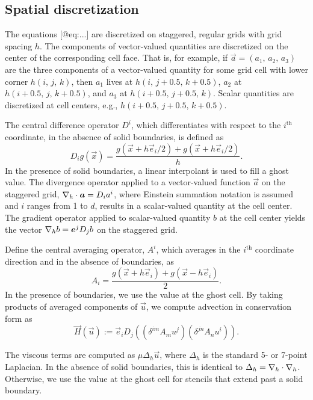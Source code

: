 \subsection{Spatial discretization}

The equations [@eq:...] are discretized on staggered, regular grids with grid
spacing $h$. The components of vector-valued quantities are discretized on the
center of the corresponding cell face. That is, for example, if
$\vec{a} = (a_1,\,a_2,\,a_3)$ are the three components of a vector-valued
quantity for some grid cell with lower corner $h(i,\,j,\,k)$, then $a_1$
lives at $h(i,\,j+0.5,\,k+0.5)$, $a_2$ at $h(i+0.5,\,j,\,k+0.5)$, and $a_3$ at
$h(i+0.5,\,j+0.5,\,k)$. Scalar quantities are discretized at cell centers,
e.g., $h(i+0.5,\,j+0.5,\,k+0.5)$.

The central difference operator $D^i$, which differentiates with respect to
the $i^\text{th}$ coordinate, in the absence of solid boundaries, is defined as
\begin{equation}
    D_ig(\vec{x}) = \frac{g(\vec{x}+h\vec{e}_i/2) + g(\vec{x}+h\vec{e}_i/2)}{h}.
\end{equation}
In the presence of solid boundaries, a linear interpolant is used to fill a
ghost value. The divergence operator applied to a vector-valued function
$\vec{a}$ on the staggered grid, $\nabla_h\cdot\boldsymbol{a} = D_ia^i$, where Einstein
summation notation is assumed and $i$ ranges from 1 to $d$, results in
a scalar-valued quantity at the cell center. The gradient operator applied to
scalar-valued quantity $b$ at the cell center yields the vector
$\nabla_hb = \boldsymbol{e}^jD_jb$ on the staggered grid.

Define the central averaging operator, $A^i$, which averages in the
$i^\text{th}$ coordinate direction and in the absence of boundaries, as
\begin{equation}
    A_i = \frac{g(\vec{x}+h\vec{e}_i)+g(\vec{x}-h\vec{e}_i)}{2}.
\end{equation}
In the presence of boundaries, we use the value at the ghost cell. By taking
products of averaged components of $\vec{u}$, we compute advection in
conservation form as
\begin{equation}
    \vec{H}(\vec{u}) := \vec{e}_iD_j((\delta^{im}A_mu^j)(\delta^{jn}A_nu^i)).
\end{equation}

The viscous terms are computed as $\mu\Delta_h\vec{u}$, where $\Delta_h$ is the
standard 5- or 7-point Laplacian. In the absence of solid boundaries, this
is identical to  $\Delta_h = \nabla_h\cdot\nabla_h$. Otherwise, we use the value
at the ghost cell for stencils that extend past a solid boundary.

